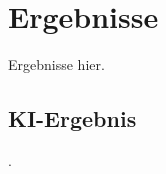 
\section{Ergebnisse}
\label{sec:ki:ergebnisse}

Ergebnisse hier.

\subsection{KI-Ergebnis}
\label{sec:ki_ergebnis}

.
